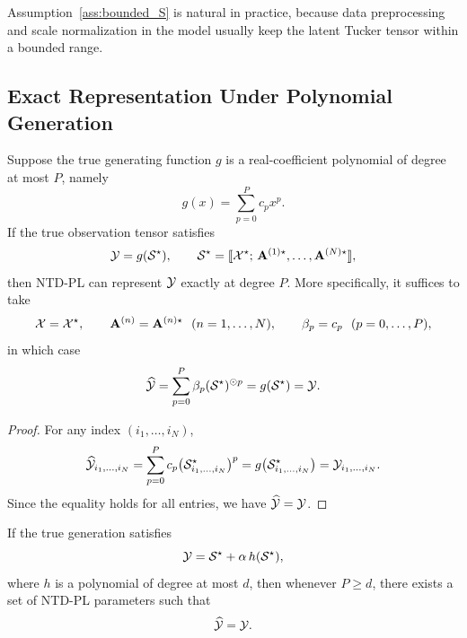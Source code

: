 Assumption~\ref{ass:bounded_S} is natural in practice, because data preprocessing and scale normalization in the model usually keep the latent Tucker tensor within a bounded range.

\subsection{Exact Representation Under Polynomial Generation}

\begin{theorem}
\label{thm:poly_exact}
Suppose the true generating function $g$ is a real-coefficient polynomial of degree at most $P$, namely
\begin{equation}
g(x)=\sum_{p=0}^{P} c_p x^p.
\end{equation}
If the true observation tensor satisfies
\begin{equation}
\mathcal{Y} = g(\mathcal{S}^\star),
\qquad
\mathcal{S}^\star
=
\llbracket
\mathcal{X}^\star;\,
\mathbf A^{(1)\star},\dots,\mathbf A^{(N)\star}
\rrbracket,
\end{equation}
then NTD-PL can represent $\mathcal{Y}$ exactly at degree $P$. More specifically, it suffices to take
\begin{equation}
\mathcal{X}=\mathcal{X}^\star,\qquad
\mathbf A^{(n)}=\mathbf A^{(n)\star}\ \ (n=1,\dots,N),\qquad
\beta_p=c_p\ \ (p=0,\dots,P),
\end{equation}
in which case
\begin{equation}
\widehat{\mathcal{Y}}
=
\sum_{p=0}^{P}\beta_p (\mathcal{S}^\star)^{\odot p}
=
g(\mathcal{S}^\star)
=
\mathcal{Y}.
\end{equation}
\end{theorem}

\begin{proof}
For any index $(i_1,\dots,i_N)$,
\begin{equation}
\widehat{\mathcal{Y}}_{i_1,\dots,i_N}
=
\sum_{p=0}^{P} c_p
\bigl(\mathcal{S}^\star_{i_1,\dots,i_N}\bigr)^p
=
g\!\left(\mathcal{S}^\star_{i_1,\dots,i_N}\right)
=
\mathcal{Y}_{i_1,\dots,i_N}.
\end{equation}
Since the equality holds for all entries, we have $\widehat{\mathcal{Y}}=\mathcal{Y}$.
\end{proof}

\begin{corollary}
\label{cor:poly_recovery}
If the true generation satisfies
\begin{equation}
\mathcal{Y}=\mathcal{S}^\star + \alpha\, h(\mathcal{S}^\star),
\end{equation}
where $h$ is a polynomial of degree at most $d$, then whenever $P\ge d$, there exists a set of NTD-PL parameters such that
\begin{equation}
\widehat{\mathcal{Y}}=\mathcal{Y}.
\end{equation}
\end{corollary}

